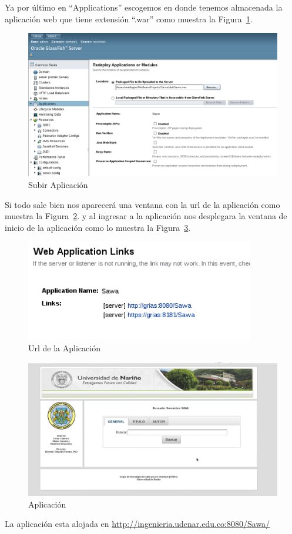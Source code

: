 Ya por último en ``Applications'' escogemos en donde tenemos almacenada la aplicación web 
que tiene extensión ``.war'' como muestra la  Figura~\ref{figura:m4}.

\begin{figure}[!ht]
\begin{center}
\includegraphics[width=13cm]{pictures/m4.png}
\end{center}
\caption{Subir Aplicación} \label{figura:m4}
\end{figure}

Si todo sale bien nos aparecerá una ventana con la url de la aplicación 
como muestra la Figura~\ref{figura:m5}. y al 
ingresar a la aplicación nos desplegara la ventana de inicio de la aplicación como lo muestra la
Figura~\ref{figura:m6}.

\begin{figure}[!ht]
\begin{center}
\includegraphics[width=10cm]{pictures/m5.png}
\end{center}
\caption{Url de la Aplicación} \label{figura:m5}
\end{figure}

\begin{figure}[!ht]
\begin{center}
\includegraphics[width=13cm]{pictures/m6.png}
\end{center}
\caption{Aplicación} \label{figura:m6}
\end{figure}

La aplicación esta alojada en \url{http://ingenieria.udenar.edu.co:8080/Sawa/}

